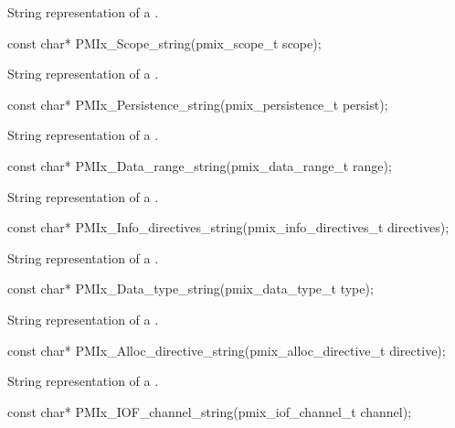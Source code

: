 \summary
{}

String representation of a .

\cspecificstart
\begin{codepar}
const char*
PMIx_Scope_string(pmix_scope_t scope);
\end{codepar}
\cspecificend

\summary
{}

String representation of a .

\cspecificstart
\begin{codepar}
const char*
PMIx_Persistence_string(pmix_persistence_t persist);
\end{codepar}
\cspecificend

\summary
{}

String representation of a .

\cspecificstart
\begin{codepar}
const char*
PMIx_Data_range_string(pmix_data_range_t range);
\end{codepar}
\cspecificend

\summary
{}

String representation of a .

\cspecificstart
\begin{codepar}
const char*
PMIx_Info_directives_string(pmix_info_directives_t directives);
\end{codepar}
\cspecificend

\summary
{}

String representation of a .

\cspecificstart
\begin{codepar}
const char*
PMIx_Data_type_string(pmix_data_type_t type);
\end{codepar}
\cspecificend

\summary
{}

String representation of a .

\cspecificstart
\begin{codepar}
const char*
PMIx_Alloc_directive_string(pmix_alloc_directive_t directive);
\end{codepar}
\cspecificend

\summary
{}

String representation of a .

\cspecificstart
\begin{codepar}
const char*
PMIx_IOF_channel_string(pmix_iof_channel_t channel);
\end{codepar}
\cspecificend




